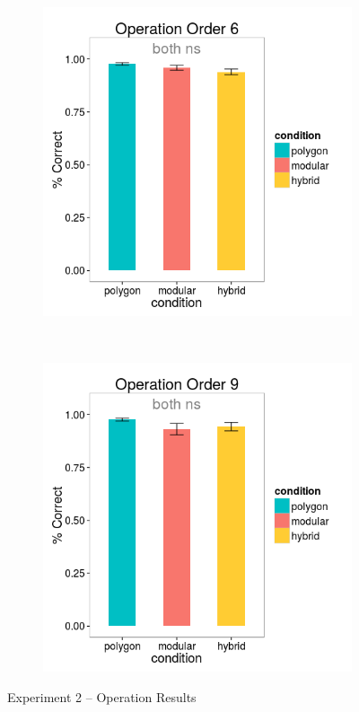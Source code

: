 \documentclass[11pt]{article}
\begin{document}
\begin{figure}[H]
\centering
\begin{subfigure}[c]{0.4\textwidth}
\centering
\includegraphics[width=\textwidth]{figures/2/op_6_r.png}
\end{subfigure}
~
\begin{subfigure}[c]{0.4\textwidth}
\centering
\includegraphics[width=\textwidth]{figures/2/op_9_r.png}
\end{subfigure}
\caption{Experiment 2 -- Operation Results}
\label{ex2_op}
\end{figure} 
\end{document}
